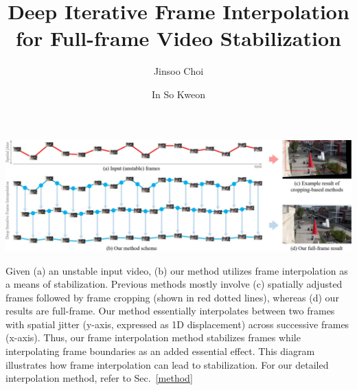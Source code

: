 \documentclass[acmtog]{acmart}
\begin{document}
\title{Deep Iterative Frame Interpolation for Full-frame Video Stabilization}

\begin{teaserfigure}
	\includegraphics[width=1\linewidth,keepaspectratio]{teaser}
	\vspace{-7mm}
	\caption{Given (a) an unstable input video, (b) our method utilizes frame interpolation as a means of stabilization. 
	Previous methods mostly involve (c) spatially adjusted frames followed by frame cropping (shown in red dotted lines), whereas (d) our results are full-frame.
	Our method essentially interpolates between two frames with spatial jitter (y-axis, expressed as 1D displacement) across successive frames (x-axis).
	Thus, our frame interpolation method stabilizes frames while interpolating frame boundaries as an added essential effect.
	This diagram illustrates how frame interpolation can lead to stabilization. 
	For our detailed interpolation method, refer to Sec.~\ref{method}
	}
	\label{teaser}
\end{teaserfigure}

\author{Jinsoo Choi}
\author{In So Kweon}
\end{document}
